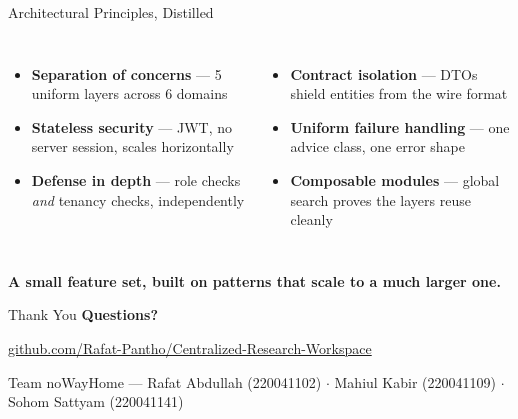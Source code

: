 \documentclass[aspectratio=169, 10pt]{beamer}
\begin{document}
\begin{frame}{Architectural Principles, Distilled}
  \begin{columns}[T,onlytextwidth]
      \begin{itemize}\setlength\itemsep{8pt}
        \item[$\bullet$] \textbf{Separation of concerns} --- 5 uniform layers across 6 domains
        \item[$\bullet$] \textbf{Stateless security} --- JWT, no server session, scales horizontally
        \item[$\bullet$] \textbf{Defense in depth} --- role checks \emph{and} tenancy checks, independently
      \end{itemize}
      \begin{itemize}\setlength\itemsep{8pt}
        \item[$\bullet$] \textbf{Contract isolation} --- DTOs shield entities from the wire format
        \item[$\bullet$] \textbf{Uniform failure handling} --- one advice class, one error shape
        \item[$\bullet$] \textbf{Composable modules} --- global search proves the layers reuse cleanly
      \end{itemize}
  \end{columns}
  \vspace{0.6cm}
  \begin{center}
    \Large\textcolor{crwblue}{\textbf{A small feature set, built on patterns that scale to a much larger one.}}
  \end{center}
\end{frame}

\begin{frame}{Thank You}
  \centering
  \vspace{0.6cm}
  {\Large \textbf{Questions?}}
  \vspace{0.8cm}

  \small
  \url{github.com/Rafat-Pantho/Centralized-Research-Workspace}

  \vspace{0.3cm}
  Team noWayHome --- Rafat Abdullah (220041102) \(\cdot\) Mahiul Kabir (220041109) \(\cdot\) Sohom Sattyam (220041141)
\end{frame}
\end{document}
